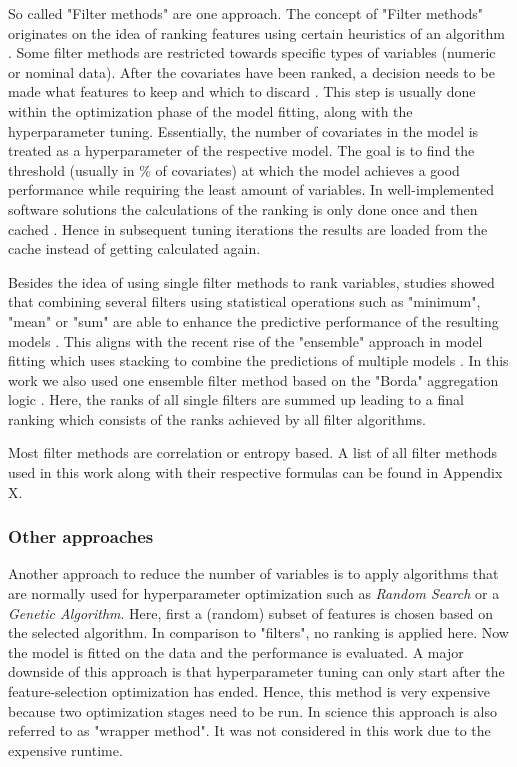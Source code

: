 \documentclass[review]{elsarticle}
\begin{document}
So called "Filter methods" are one approach.
The concept of "Filter methods" originates on the idea of ranking features using certain heuristics of an algorithm \citep{chandrashekar2014}.
Some filter methods are restricted towards specific types of variables (numeric or nominal data).
After the covariates have been ranked, a decision needs to be made what features to keep and which to discard \citep{drotar2015}.
This step is usually done within the optimization phase of the model fitting, along with the hyperparameter tuning.
Essentially, the number of covariates in the model is treated as a hyperparameter of the respective model.
The goal is to find the threshold (usually in \% of covariates) at which the model achieves a good performance while requiring the least amount of variables.
In well-implemented software solutions the calculations of the ranking is only done once and then cached \citep{mlr}.
Hence in subsequent tuning iterations the results are loaded from the cache instead of getting calculated again.

Besides the idea of using single filter methods to rank variables, studies showed that combining several filters using statistical operations such as "minimum", "mean" or "sum" are able to enhance the predictive performance of the resulting models \citep{abeel2010, drotar2017a}.
This aligns with the recent rise of the "ensemble" approach in model fitting which uses stacking to combine the predictions of multiple models \citep{polikar2012, feurer2015}.
In this work we also used one ensemble filter method based on the "Borda" aggregation logic \citep{drotar2017a}.
Here, the ranks of all single filters are summed up leading to a final ranking which consists of the ranks achieved by all filter algorithms.

Most filter methods are correlation or entropy based.
A list of all filter methods used in this work along with their respective formulas can be found in Appendix X.

\subsubsection{Other approaches}

Another approach to reduce the number of variables is to apply algorithms that are normally used for hyperparameter optimization such as \textit{Random Search} or a \textit{Genetic Algorithm}.
Here, first a (random) subset of features is chosen based on the selected algorithm.
In comparison to "filters", no ranking is applied here.
Now the model is fitted on the data and the performance is evaluated.
A major downside of this approach is that hyperparameter tuning can only start after the feature-selection optimization has ended.
Hence, this method is very expensive because two optimization stages need to be run.
In science this approach is also referred to as "wrapper method".
It was not considered in this work due to the expensive runtime.
\end{document}
